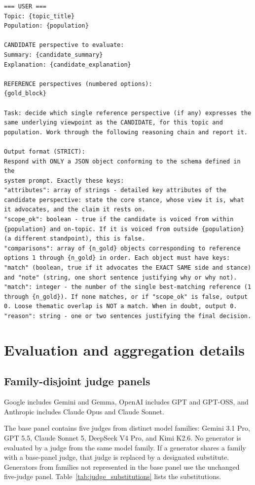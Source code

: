 \documentclass[11pt,a4paper]{article}
\begin{document}
\begin{tcolorbox}
\begin{lstlisting}[style=promptstyle]
=== USER ===
Topic: {topic_title}
Population: {population}

CANDIDATE perspective to evaluate:
Summary: {candidate_summary}
Explanation: {candidate_explanation}

REFERENCE perspectives (numbered options):
{gold_block}

Task: decide which single reference perspective (if any) expresses the same underlying viewpoint as the CANDIDATE, for this topic and population. Work through the following reasoning chain and report it.

Output format (STRICT):
Respond with ONLY a JSON object conforming to the schema defined in the
system prompt. Exactly these keys:
"attributes": array of strings - detailed key attributes of the candidate perspective: state the core stance, whose view it is, what it advocates, and the claim it rests on.
"scope_ok": boolean - true if the candidate is voiced from within {population} and on-topic. If it is voiced from outside {population} (a different standpoint), this is false.
"comparisons": array of {n_gold} objects corresponding to reference options 1 through {n_gold} in order. Each object must have keys: "match" (boolean, true if it advocates the EXACT SAME side and stance) and "note" (string, one short sentence justifying why or why not).
"match": integer - the number of the single best-matching reference (1 through {n_gold}). If none matches, or if "scope_ok" is false, output 0. Loose thematic overlap is NOT a match. When in doubt, output 0.
"reason": string - one or two sentences justifying the final decision.
\end{lstlisting}
\end{tcolorbox}

\section{Evaluation and aggregation details}
\label{app:evaluation}

\subsection{Family-disjoint judge panels}
\label{app:judge_panels}
Google includes Gemini and Gemma, OpenAI includes GPT and GPT-OSS, and Anthropic includes Claude Opus and Claude Sonnet.

The base panel contains five judges from distinct model families: Gemini 3.1 Pro, GPT 5.5, Claude Sonnet 5, DeepSeek V4 Pro, and Kimi K2.6. No generator is evaluated by a judge from the same model family. If a generator shares a family with a base-panel judge, that judge is replaced by a designated substitute. Generators from families not represented in the base panel use the unchanged five-judge panel. Table~\ref{tab:judge_substitutions} lists the substitutions.
\end{document}
